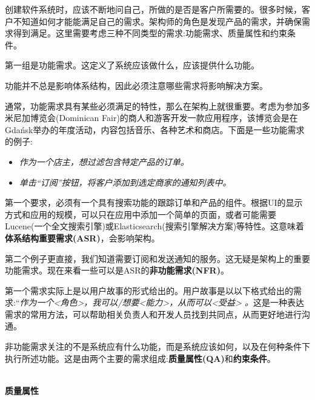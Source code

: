 
创建软件系统时，应该不断地问自己，所做的是否是客户所需要的。很多时候，客户不知道如何才能能满足自己的需求。架构师的角色是发现产品的需求，并确保需求得到满足。这里需要考虑三种不同类型的需求:功能需求、质量属性和约束条件。


第一组是功能需求。这定义了系统应该做什么，应该提供什么功能。

\begin{tcolorbox}[colback=webgreen!5!white,colframe=webgreen!75!black, title=TIP]
\hspace*{0.8cm}功能并不总是影响体系结构，因此必须注意哪些需求将影响解决方案。
\end{tcolorbox}

通常，功能需求具有某些必须满足的特性，那么在架构上就很重要。考虑为参加多米尼加博览会(Dominican Fair)的商人和游客开发一款应用程序，该博览会是在Gdańsk举办的年度活动，内容包括音乐、各种艺术和商店。下面是一些功能需求的例子:

\begin{itemize}
\item 
\textit{作为一个店主，想过滤包含特定产品的订单。}

\item 
\textit{单击“订阅”按钮，将客户添加到选定商家的通知列表中。}
\end{itemize}

第一个要求，必须有一个具有搜索功能的跟踪订单和产品的组件。根据UI的显示方式和应用的规模，可以只在应用中添加一个简单的页面，或者可能需要Lucene(一个全文搜索引擎)或Elasticsearch(搜索引擎解决方案)等特性。这意味着\textbf{体系结构重要需求(ASR)}，会影响架构。

第二个例子更直接，我们知道需要订阅和发送通知的服务。这无疑是架构上的重要功能需求。现在来看一些可以是ASR的\textbf{非功能需求(NFR)}。

第一个需求实际上是以用户故事的形式给出的。用户故事是以以下格式给出的需求:“\textit{作为一个<角色>，我可以/想要<能力>，从而可以<受益> 。}这是一种表达需求的常用方法，可以帮助相关负责人和开发人员找到共同点，从而更好地进行沟通。


非功能需求关注的不是系统应有什么功能，而是系统应该如何，以及在何种条件下执行所述功能。这是由两个主要的需求组成:\textbf{质量属性(QA)}和\textbf{约束条件}。

\hspace*{\fill} \\ %
\noindent
\textbf{质量属性}

